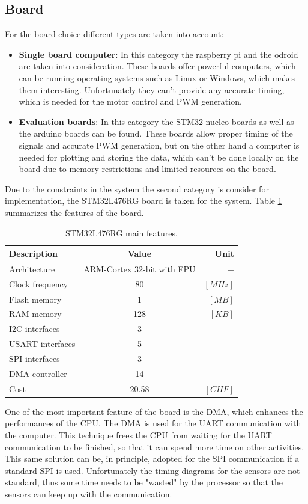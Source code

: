 \documentclass[12pt,a4paper]{article}
\begin{document}
\subsection{Board}
For the board choice different types are taken into account:
\begin{itemize}
	\item \textbf{Single board computer}: In this category the raspberry pi and the odroid are taken into consideration. These boards offer powerful computers, which can be running operating systems such as Linux or Windows, which makes them interesting. Unfortunately they can't provide any accurate timing,  which is needed for the motor control and PWM generation.
	\item \textbf{Evaluation boards}: In this category the STM32 nucleo boards as well as the arduino boards can be found. These boards allow proper timing of the signals and accurate PWM generation, but on the other hand a computer is needed for plotting and storing the data, which can't be done locally on the board due to memory restrictions and limited resources on the board.
\end{itemize}
Due to the constraints in the system the second category is consider for implementation, the STM32L476RG board is taken for the system. Table \ref{tab:board} summarizes the features of the board.
\begin{table}[H]
	\centering
	\begin{tabular}{l||c|r} 
		\textbf{Description}&\textbf{Value}  &\textbf{Unit}  \\ 
		\hline
		\hline 
		Architecture & ARM-Cortex 32-bit with FPU & $-$ \\ 
		\hline 
		Clock frequency & 80  & $[MHz]$  \\ 
		\hline 
		Flash memory & 1 & $[MB]$ \\ 
		\hline 
		RAM memory & 128 & $[KB]$  \\ 
		\hline 
		I2C interfaces & 3 & $-$  \\ 
		\hline 
		USART interfaces & 5  & $-$  \\ 
		\hline 
		SPI interfaces & 3  & $-$  \\  
		\hline 
		DMA controller & 14 & $-$  \\
		\hline
		Cost & 20.58 &$[CHF]$
	\end{tabular} 
	\caption{STM32L476RG main features.}
	\label{tab:board}
\end{table}
One of the most important feature of the board is the DMA, which enhances the performances of the CPU. The DMA is used for the UART communication with the computer. This technique frees the CPU from waiting for the UART communication to be finished, so that it can spend more time on other activities. This same solution can be, in principle, adopted for the SPI communication if a standard SPI is used. Unfortunately the timing diagrams for the sensors are not standard, thus some time needs to be "wasted" by the processor so that the sensors can keep up with the communication.
\end{document}
